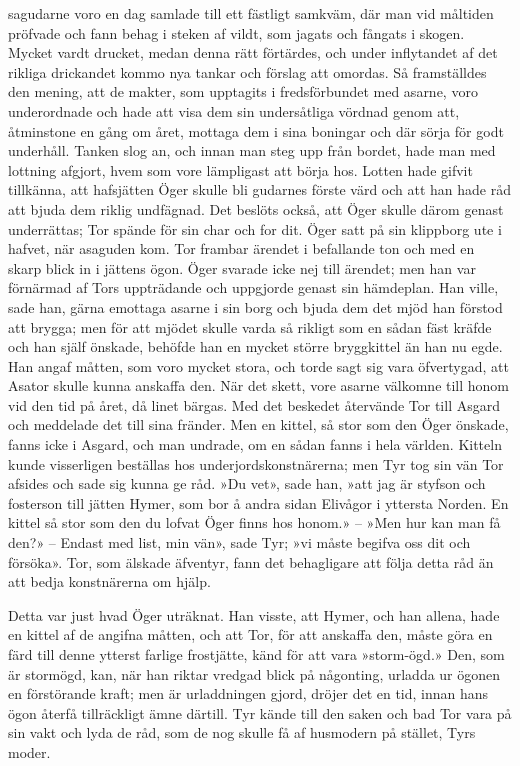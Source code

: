 \dropcapA sagudarne voro en dag samlade till ett fästligt samkväm, där man vid
måltiden pröfvade och fann behag i steken af vildt, som jagats och
fångats i skogen. Mycket vardt drucket, medan denna rätt förtärdes, och
under inflytandet af det rikliga drickandet kommo nya tankar och förslag
att omordas. Så framställdes den mening, att de makter, som upptagits i
fredsförbundet med asarne, voro underordnade och hade att visa dem sin
undersåtliga vördnad genom att, åtminstone en gång om året, mottaga dem
i sina boningar och där sörja för godt underhåll. Tanken slog an, och
innan man steg upp från bordet, hade man med lottning afgjort, hvem som
vore lämpligast att börja hos. Lotten hade gifvit tillkänna, att
hafsjätten Öger skulle bli gudarnes förste värd och att han hade råd att
bjuda dem riklig undfägnad. Det beslöts också, att Öger skulle därom
genast underrättas; Tor spände för sin char och for dit. Öger satt på
sin klippborg ute i hafvet, när asaguden kom. Tor frambar ärendet i
befallande ton och med en skarp blick in i jättens ögon. Öger svarade
icke nej till ärendet; men han var förnärmad af Tors uppträdande och
uppgjorde genast sin hämdeplan. Han ville, sade han, gärna emottaga
asarne i sin borg och bjuda dem det mjöd han förstod att brygga; men för
att mjödet skulle varda så rikligt som en sådan fäst kräfde och han
själf önskade, behöfde han en mycket större bryggkittel än han nu egde.
Han angaf måtten, som voro mycket stora, och torde sagt sig vara
öfvertygad, att Asator skulle kunna anskaffa den. När det skett, vore
asarne välkomne till honom vid den tid på året, då linet bärgas. Med det
beskedet återvände Tor till Asgard och meddelade det till sina fränder.
Men en kittel, så stor som den Öger önskade, fanns icke i Asgard, och
man undrade, om en sådan fanns i hela världen. Kitteln kunde visserligen
beställas hos underjordskonstnärerna;
men Tyr tog sin vän Tor afsides och sade sig kunna ge råd. »Du vet»,
sade han, »att jag är styfson och fosterson till jätten Hymer, som bor å
andra sidan Elivågor i yttersta Norden. En kittel så stor som den du
lofvat Öger finns hos honom.» -- »Men hur kan man få den?» -- Endast med
list, min vän», sade Tyr; »vi måste begifva oss dit och försöka». Tor,
som älskade äfventyr, fann det behagligare att följa detta råd än att
bedja konstnärerna om hjälp.

Detta var just hvad Öger uträknat. Han visste, att Hymer, och han
allena, hade en kittel af de angifna måtten, och att Tor, för att
anskaffa den, måste göra en färd till denne ytterst farlige frostjätte,
känd för att vara »storm-ögd.» Den, som är stormögd, kan, när han riktar
vredgad blick på någonting, urladda ur ögonen en förstörande kraft; men
är urladdningen gjord, dröjer det en tid, innan hans ögon återfå
tillräckligt ämne därtill. Tyr kände till den saken och bad Tor vara på
sin vakt och lyda de råd, som de nog skulle få af husmodern på stället,
Tyrs moder.

